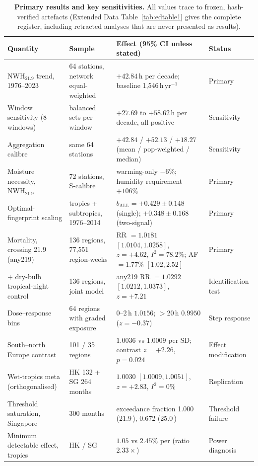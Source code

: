 \begin{table}[htbp]
\centering
\footnotesize
\caption{\textbf{Primary results and key sensitivities.} All values trace to frozen,
hash-verified artefacts (Extended Data Table~\ref{tab:edtable1} gives the complete register,
including retracted analyses that are never presented as results).}
\label{tab:main}
\begin{tabular}{p{5.2cm}p{4.0cm}p{6.2cm}l}
\toprule
Quantity & Sample & Effect (95\% CI unless stated) & Status \\
\midrule
$\mathrm{NWH}_{21.9}$ trend, 1976--2023 & 64 stations, network equal-weighted & $+42.84$\,h per decade; baseline 1,546\,h\,yr$^{-1}$ & Primary \\
Window sensitivity (8 windows) & balanced sets per window & $+27.69$ to $+58.62$\,h per decade, all positive & Sensitivity \\
Aggregation calibre & same 64 stations & $+42.84$ / $+52.13$ / $+18.27$ (mean / pop-weighted / median) & Sensitivity \\
Moisture necessity, $\mathrm{NWH}_{21.9}$ & 72 stations, S-calibre & warming-only $-6\%$; humidity requirement $+106\%$ & Primary \\
Optimal-fingerprint scaling & tropics + subtropics, 1976--2014 & $b_\mathrm{ALL}=+0.429\pm0.148$ (single); $+0.348\pm0.168$ (two-signal) & Primary \\
Mortality, crossing 21.9\,\dd{} (any219) & 136 regions, 77,551 region-weeks & RR $=1.0181$ $[1.0104,1.0258]$, $z=+4.62$, $I^2=78.2\%$; AF $=1.77\%$ $[1.02,2.52]$ & Primary \\
$+$ dry-bulb tropical-night control & 136 regions, joint model & any219 RR $=1.0292$ $[1.0212,1.0373]$, $z=+7.21$ & Identification test \\
Dose--response bins & 64 regions with graded exposure & 0--2\,h $1.0156$; $>$20\,h $0.9950$ ($z=-0.37$) & Step response \\
South--north Europe contrast & 101 / 35 regions & $1.0036$ vs $1.0009$ per SD; contrast $z=+2.26$, $p=0.024$ & Effect modification \\
Wet-tropics meta (orthogonalised) & HK 132 + SG 264 months & $1.0030$ $[1.0009,1.0051]$, $z=+2.83$, $I^2=0\%$ & Replication \\
Threshold saturation, Singapore & 300 months & exceedance fraction 1.000 (21.9\,\dd{}), 0.672 (25.0\,\dd{}) & Threshold failure \\
Minimum detectable effect, tropics & HK / SG & $1.05$ vs $2.45\%$ per \dd{} (ratio $2.33\times$) & Power diagnosis \\

\end{tabular}
\end{table}
